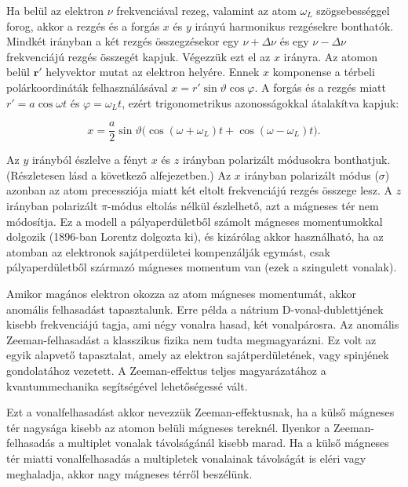 \documentclass[a4paper,12pt]{article}
\begin{document}
Ha belül az elektron \(\nu\) frekvenciával rezeg, valamint az atom
\(\omega_L\) szögsebességgel forog, akkor a rezgés és a forgás
\(x\) és \(y\) irányú harmonikus rezgésekre bonthatók.
Mindkét irányban a két rezgés összegzésekor egy \(\nu+\Delta\nu\) és
egy \(\nu-\Delta\nu\) frekvenciájú rezgés összegét kapjuk.
Végezzük ezt el az \(x\) irányra.
Az atomon belül \(\mathbf{r}'\) helyvektor mutat az elektron helyére.
Ennek \(x\) komponense a térbeli polárkoordináták felhasználásával
\(x = r'\sin\vartheta\cos\varphi\).
A forgás és a rezgés miatt
\(r' = a\cos\omega t\) és \(\varphi=\omega_L t\), ezért trigonometrikus
azonosságokkal átalakítva kapjuk:

\begin{equation}
x = \frac{a}{2}\sin\vartheta\big(\cos(\omega+\omega_L)t + \cos(\omega-\omega_L)t\big).
\end{equation}

Az \(y\) irányból észlelve a fényt \(x\) és \(z\) irányban polarizált
módusokra bonthatjuk. (Részletesen lásd a következő alfejezetben.)
Az \(x\) irányban polarizált módus (\(\sigma\)) azonban az atom
precessziója miatt két eltolt frekvenciájú rezgés összege lesz.
A \(z\) irányban polarizált \(\pi\)-módus eltolás nélkül észlelhető,
azt a mágneses tér nem módosítja.
Ez a modell a pályaperdületből számolt mágneses momentumokkal dolgozik
(1896-ban Lorentz dolgozta ki), és kizárólag akkor használható, ha az
atomban az elektronok sajátperdületei kompenzálják egymást,
csak pályaperdületből származó mágneses momentum van
(ezek a szingulett vonalak).

Amikor magános elektron okozza az atom mágneses momentumát, akkor
anomális felhasadást tapasztalunk.
Erre példa a nátrium D-vonal-dublettjének kisebb frekvenciájú tagja,
ami négy vonalra hasad, két vonalpárosra.
Az anomális Zeeman-felhasadást a klasszikus fizika nem tudta megmagyarázni.
Ez volt az egyik alapvető tapasztalat, amely az elektron sajátperdületének,
vagy spinjének gondolatához vezetett.
A Zeeman-effektus teljes magyarázatához a kvantummechanika segítségével
lehetőségessé vált.

Ezt a vonalfelhasadást akkor nevezzük Zeeman-effektusnak, ha a külső
mágneses tér nagysága kisebb az atomon belüli mágneses tereknél.
Ilyenkor a Zeeman-felhasadás a multiplet vonalak távolságánál kisebb marad.
Ha a külső mágneses tér miatti vonalfelhasadás a multipletek vonalainak
távolságát is eléri vagy meghaladja, akkor nagy mágneses térről beszélünk.
\end{document}
